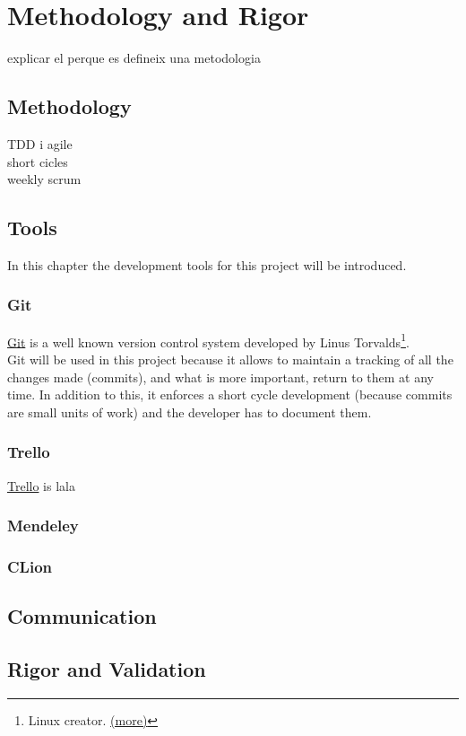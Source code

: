 \chapter{Methodology and Rigor} %

\label{Chapter4} %

explicar el perque es defineix una metodologia

\section{Methodology}
TDD i agile\\
short cicles\\
weekly scrum\\

\section{Tools}
In this chapter the development tools for this project will be introduced. 
\subsection{Git}
\href{https://git-scm.com/}{Git} is a well known version control system developed by Linus Torvalds\footnote{Linux creator. \href{https://en.wikipedia.org/wiki/Linus_Torvalds}{(more)}}.\\
Git will be used in this project because it allows to maintain a tracking of all the changes made (commits), and what is more important, return to them at any time. In addition to this, it enforces a short cycle development (because commits are small units of work) and the developer has to document them.
\subsection{Trello}
\href{https://trello.com}{Trello} is lala
\subsection{Mendeley}
\subsection{CLion}

\section{Communication}

\section{Rigor and Validation}